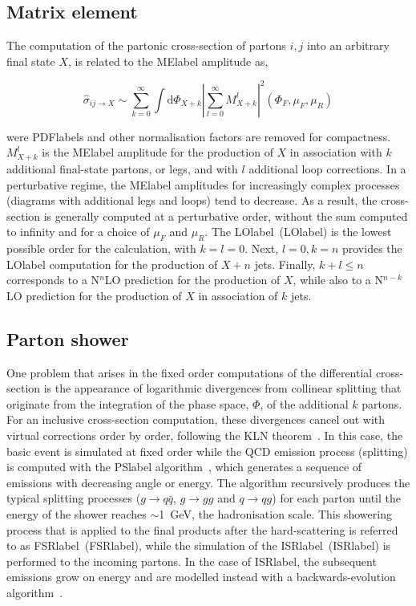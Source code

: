 \subsection{Matrix element}

The computation of the partonic cross-section of partons $i,j$ into an arbitrary final state $X$, is related to the \acrshort{MElabel} amplitude as,

\begin{equation}
    \hat{\sigma}_{ij\to X} \sim \sum_{k=0}^{\infty} \int \text{d}\Phi_{X+k}\left|\sum_{l=0}^{\infty} M^l_{X+k}\right|^2(\Phi_F,\mu_F,\mu_R)
\end{equation}

were \acrshort{PDFlabel}s and other normalisation factors are removed for compactness. $M^l_{X+k}$ is the \acrshort{MElabel} amplitude for the production of $X$ in association with $k$ additional final-state partons, or legs, and with $l$ additional loop corrections. In a perturbative regime, the \acrshort{MElabel} amplitudes for increasingly complex processes (diagrams with additional legs and loops) tend to decrease. As a result, the cross-section is generally computed at a perturbative order, without the sum computed to infinity and for a choice of $\mu_F$ and $\mu_R$. The \acrlong{LOlabel}~(\acrshort{LOlabel}) is the lowest possible order for the calculation, with $k=l=0$. Next, $l=0,k=n$ provides the \acrshort{LOlabel} computation for the production of $X+n$ jets. Finally, $k+l\leq n$ corresponds to a N$^n$LO prediction for the production of $X$, while also to a N$^{n-k}$LO prediction for the production of $X$ in association of $k$ jets.

\subsection{Parton shower}

One problem that arises in the fixed order computations of the differential cross-section is the appearance of logarithmic divergences from collinear splitting that originate from the integration of the phase space, $\Phi$, of the additional $k$ partons. For an inclusive cross-section computation, these divergences cancel out with virtual corrections order by order, following the KLN theorem~\cite{Masssingularities,PhysRev.133.B1549}.
In this case, the basic event is simulated at fixed order while the \acrshort{QCD} emission process (splitting) is computed with the \acrshort{PSlabel} algorithm~\cite{FOX1980285}, 
which generates a sequence of emissions with decreasing angle or energy. The algorithm recursively produces the typical splitting processes ($g\to q\bar{q}$, $g\to gg$ and $q\to qg$) for each parton until the energy of the shower reaches $\sim$1~GeV, the hadronisation scale. This showering process that is applied to the final products after the hard-scattering is referred to as \acrlong{FSRlabel}~(\acrshort{FSRlabel}), while the simulation of the \acrlong{ISRlabel}~(\acrshort{ISRlabel}) is performed to the incoming partons. In the case of \acrshort{ISRlabel}, the subsequent emissions grow on energy and are modelled instead with a backwards-evolution algorithm~\cite{SJOSTRAND1985321}. 

